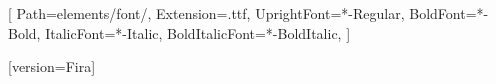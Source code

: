 
\setmainfont{Swis721BT}[
    Path=elements/font/,
    Extension=.ttf,
    UprightFont=*-Regular,
    BoldFont=*-Bold,
    ItalicFont=*-Italic,
    BoldItalicFont=*-BoldItalic,
]

[version=Fira]